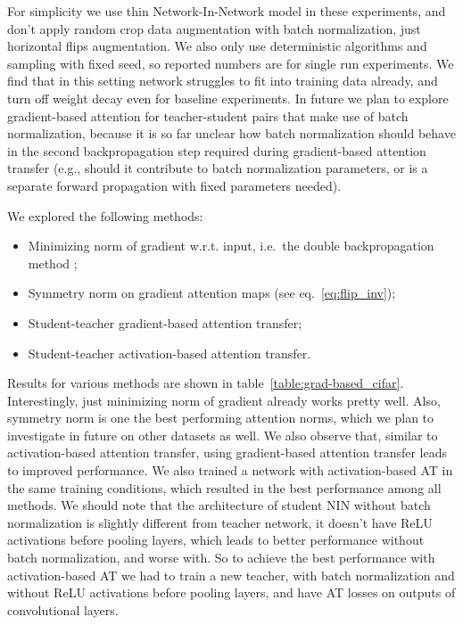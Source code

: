 \documentclass{article} \usepackage{iclr2017_conference}
\begin{document}
For simplicity we use thin Network-In-Network model in these experiments, and don't apply random crop data augmentation with batch normalization, just horizontal flips augmentation. We also only use deterministic algorithms and sampling with fixed seed, so reported numbers are for single run experiments. We find that in this setting network struggles to fit into training data already, and turn off weight decay even for baseline experiments. In future we plan to explore gradient-based attention for teacher-student pairs that make use of batch normalization, because it is so far unclear how batch normalization should behave in the second backpropagation step required during gradient-based attention transfer (e.g., should it contribute to batch normalization parameters, or is a separate forward propagation with fixed parameters needed).

We explored the following methods:

\begin{itemize}
\item Minimizing  norm of gradient  w.r.t. input, i.e.\ the double backpropagation method \cite{drucker-lecun-92};
  \item Symmetry norm on gradient attention maps (see eq.~\ref{eq:flip_inv});
  \item Student-teacher gradient-based attention transfer;
  \item Student-teacher activation-based attention transfer.
\end{itemize}

Results for various methods are shown in table~\ref{table:grad-based_cifar}. Interestingly, just minimizing  norm of gradient already works pretty well. Also, symmetry norm is one the best performing attention norms, which we plan to investigate in future on other datasets as well. We also observe that, similar to activation-based attention transfer, using gradient-based attention transfer leads to improved performance. We also trained a network with activation-based AT in the same training conditions, which resulted in the best performance among all methods. We should note that the architecture of student NIN without batch normalization is slightly different from teacher network, it doesn't have ReLU activations before pooling layers, which leads to better performance without batch normalization, and worse with. So to achieve the best performance with activation-based AT we had to train a new teacher, with batch normalization and without ReLU activations before pooling layers, and have AT losses on outputs of convolutional layers.
\end{document}
